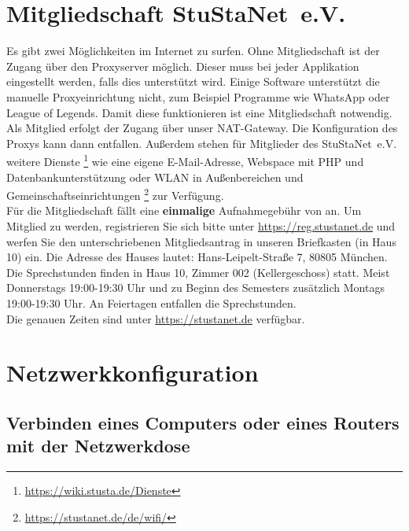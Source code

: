\documentclass[a4paper,12pt]{scrartcl}
\begin{document}

\section*{Mitgliedschaft StuStaNet~e.V.}
Es gibt zwei Möglichkeiten im Internet zu surfen. Ohne Mitgliedschaft ist der Zugang über den Proxyserver möglich. Dieser muss bei jeder Applikation eingestellt werden, falls dies unterstützt wird. Einige Software unterstützt die manuelle Proxyeinrichtung nicht, zum Beispiel Programme wie WhatsApp oder League of Legends. Damit diese funktionieren ist eine Mitgliedschaft notwendig.
\pagebreak\linebreak
Als Mitglied erfolgt der Zugang über unser NAT-Gateway. Die Konfiguration des Proxys kann dann entfallen. Außerdem stehen für Mitglieder des StuStaNet~e.V. weitere Dienste \footnote{\url{https://wiki.stusta.de/Dienste}} wie eine eigene E-Mail-Adresse, Webspace mit PHP und Datenbankunterstützung oder WLAN in Außenbereichen und Gemeinschaftseinrichtungen \footnote{\url{https://stustanet.de/de/wifi/}} zur Verfügung. 
\\
Für die Mitgliedschaft fällt eine \textbf{einmalige} Aufnahmegebühr von  an. Um Mitglied zu werden, registrieren Sie sich bitte unter \mbox{\url{https://reg.stustanet.de}} und werfen Sie den unterschriebenen Mitgliedsantrag in unseren Briefkasten (in Haus 10) ein. Die Adresse des Hauses lautet: Hans-Leipelt-Straße 7, 80805 München.
\\
Die Sprechstunden finden in Haus 10, Zimmer 002 (Kellergeschoss) statt. Meist Donnerstags 19:00-19:30 Uhr und zu Beginn des Semesters zusätzlich Montags 19:00-19:30 Uhr. An Feiertagen entfallen die Sprechstunden.
\\
Die genauen Zeiten sind unter \mbox{\url{https://stustanet.de}} verfügbar.

\section*{Netzwerkkonfiguration}
\subsection*{Verbinden eines Computers oder eines Routers mit der Netzwerkdose}
\end{document}
